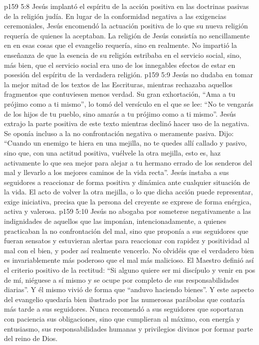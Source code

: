 \vs p159 5:8 Jesús implantó el espíritu de la acción positiva en las doctrinas pasivas de la religión judía. En lugar de la conformidad negativa a las exigencias ceremoniales, Jesús encomendó la actuación positiva de lo que su nueva religión requería de quienes la aceptaban. La religión de Jesús consistía no sencillamente en  en esas cosas que el evangelio requería, sino en  realmente. No impartió la enseñanza de que la esencia de su religión estribaba en el servicio social, sino, más bien, que el servicio social era uno de los innegables efectos de estar en posesión del espíritu de la verdadera religión.
\vs p159 5:9 Jesús no dudaba en tomar la mejor mitad de los textos de las Escrituras, mientras rechazaba aquellos fragmentos que contuviesen menos verdad. Su gran exhortación, “Ama a tu prójimo como a ti mismo”, lo tomó del versículo en el que se lee: “No te vengarás de los hijos de tu pueblo, sino amarás a tu prójimo como a ti mismo”. Jesús extrajo la parte positiva de este texto mientras declinó hacer uso de la negativa. Se oponía incluso a la no confrontación negativa o meramente pasiva. Dijo: “Cuando un enemigo te hiera en una mejilla, no te quedes allí callado y pasivo, sino que, con una actitud positiva, vuélvele la otra mejilla, esto es, haz activamente lo que sea mejor para alejar a tu hermano errado de los senderos del mal y llevarlo a los mejores caminos de la vida recta”. Jesús instaba a sus seguidores a reaccionar de forma positiva y dinámica ante cualquier situación de la vida. El acto de volver la otra mejilla, o lo que dicha acción puede representar, exige iniciativa, precisa que la persona del creyente se exprese de forma enérgica, activa y valerosa.
\vs p159 5:10 Jesús no abogaba por someterse negativamente a las indignidades de aquellos que las imponían, intencionadamente, a quienes practicaban la no confrontación del mal, sino que proponía a sus seguidores que fueran sensatos y estuvieran alertas para reaccionar con rapidez y positividad al mal con el bien, y poder así realmente vencerlo. No olvidéis que el verdadero bien es invariablemente más poderoso que el mal más malicioso. El Maestro definió así el criterio positivo de la rectitud: “Si alguno quiere ser mi discípulo y venir en pos de mí, niéguese a sí mismo y se ocupe por completo de sus responsabilidades diarias”. Y él mismo vivió de forma que “anduvo haciendo bienes”. Y este aspecto del evangelio quedaría bien ilustrado por las numerosas parábolas que contaría más tarde a sus seguidores. Nunca recomendó a sus seguidores que soportaran con paciencia sus obligaciones, sino que cumplieran al máximo, con energía y entusiasmo, sus responsabilidades humanas y privilegios divinos por formar parte del reino de Dios.
